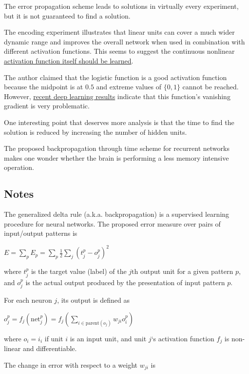 \documentclass[]{article}
\begin{document}
The error propagation scheme leads to solutions in virtually every
experiment, but it is not guaranteed to find a solution.

The encoding experiment illustrates that linear units can cover a much
wider dynamic range and improves the overall network when used in
combination with different activation functions. This seems to suggest
the continuous nonlinear
\href{http://allthingsphi.com/blog/2016/11/15/maxout-networks.html}{activation
function itself should be learned}.

The author claimed that the logistic function is a good activation
function because the midpoint is at \(0.5\) and extreme values of
\(\{ 0, 1 \}\) cannot be reached. However,
\href{http://allthingsphi.com/blog/2016/11/09/efficient-backprop.html}{recent
deep learning results} indicate that this function's vanishing gradient
is very problematic.

One interesting point that deserves more analysis is that the time to
find the solution is reduced by increasing the number of hidden units.

The proposed backpropagation through time scheme for recurrent networks
makes one wonder whether the brain is performing a less memory intensive
operation.

\subsection{Notes}\label{header-n73}

The generalized delta rule (a.k.a. backpropagation) is a supervised
learning procedure for neural networks. The proposed error measure over
pairs of input/output patterns is

\(E = \sum_p E_p = \sum_p \frac{1}{2} \sum_j (t^p_j - o^p_j)^2\)

where \(t^p_j\) is the target value (label) of the \(j\text{th}\) output
unit for a given pattern \(p\), and \(o^p_j\) is the actual output
produced by the presentation of input pattern \(p\).

For each neuron \(j\), its output is defined as

\(o^p_j = f_j\left( \text{net}^p_j \right) = f_j\left( \sum_{i \in \text{parent}(o_j)} w_{ji} o^p_i \right)\)

where \(o_i = i_i\) if unit \(i\) is an input unit, and unit \(j\)`s
activation function \(f_j\) is non-linear and differentiable.

The change in error with respect to a weight \(w_{ji}\) is
\end{document}
